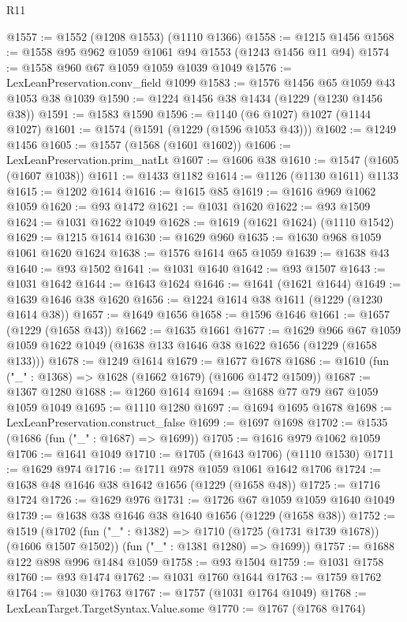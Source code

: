 \begin{lexlean}{R11}
\begin{coremodule}
@1557 := @1552 (@1208 @1553) (@1110 @1366)
@1558 := @1215 @1456
@1568 := @1558 @95 @962 @1059 @1061 @94 @1553 (@1243 @1456 @11 @94)
@1574 := @1558 @960 @67 @1059 @1059 @1039 @1049
@1576 := LexLeanPreservation.conv_field @1099
@1583 := @1576 @1456 @65 @1059 @43 @1053 @38 @1039
@1590 := @1224 @1456 @38 @1434 (@1229 (@1230 @1456 @38))
@1591 := @1583 @1590
@1596 := @1140 (@6 @1027) @1027 (@1144 @1027)
@1601 := @1574 (@1591 (@1229 (@1596 @1053 @43)))
@1602 := @1249 @1456
@1605 := @1557 (@1568 (@1601 @1602))
@1606 := LexLeanPreservation.prim_natLt
@1607 := @1606 @38
@1610 := @1547 (@1605 (@1607 @1038))
@1611 := @1433 @1182
@1614 := @1126 (@1130 @1611) @1133
@1615 := @1202 @1614
@1616 := @1615 @85
@1619 := @1616 @969 @1062 @1059
@1620 := @93 @1472
@1621 := @1031 @1620
@1622 := @93 @1509
@1624 := @1031 @1622 @1049
@1628 := @1619 (@1621 @1624) (@1110 @1542)
@1629 := @1215 @1614
@1630 := @1629 @960
@1635 := @1630 @968 @1059 @1061 @1620 @1624
@1638 := @1576 @1614 @65 @1059
@1639 := @1638 @43
@1640 := @93 @1502
@1641 := @1031 @1640
@1642 := @93 @1507
@1643 := @1031 @1642
@1644 := @1643 @1624
@1646 := @1641 (@1621 @1644)
@1649 := @1639 @1646 @38 @1620
@1656 := @1224 @1614 @38 @1611 (@1229 (@1230 @1614 @38))
@1657 := @1649 @1656
@1658 := @1596 @1646
@1661 := @1657 (@1229 (@1658 @43))
@1662 := @1635 @1661
@1677 := @1629
    @966
    @67
    @1059
    @1059
    @1622
    @1049
    (@1638 @133 @1646 @38 @1622 @1656 (@1229 (@1658 @133)))
@1678 := @1249 @1614
@1679 := @1677 @1678
@1686 := @1610 (fun ("_" : @1368) => @1628 (@1662 @1679) (@1606 @1472 @1509))
@1687 := @1367 @1280
@1688 := @1260 @1614
@1694 := @1688 @77 @79 @67 @1059 @1059 @1049
@1695 := @1110 @1280
@1697 := @1694 @1695 @1678
@1698 := LexLeanPreservation.construct_false
@1699 := @1697 @1698
@1702 := @1535 (@1686 (fun ("_" : @1687) => @1699))
@1705 := @1616 @979 @1062 @1059
@1706 := @1641 @1049
@1710 := @1705 (@1643 @1706) (@1110 @1530)
@1711 := @1629 @974
@1716 := @1711 @978 @1059 @1061 @1642 @1706
@1724 := @1638 @48 @1646 @38 @1642 @1656 (@1229 (@1658 @48))
@1725 := @1716 @1724
@1726 := @1629 @976
@1731 := @1726 @67 @1059 @1059 @1640 @1049
@1739 := @1638 @38 @1646 @38 @1640 @1656 (@1229 (@1658 @38))
@1752 := @1519
    (@1702
      (fun ("_" : @1382) => @1710 (@1725 (@1731 @1739 @1678)) (@1606 @1507 @1502))
      (fun ("_" : @1381 @1280) => @1699))
@1757 := @1688 @122 @898 @996 @1484 @1059
@1758 := @93 @1504
@1759 := @1031 @1758
@1760 := @93 @1474
@1762 := @1031 @1760 @1644
@1763 := @1759 @1762
@1764 := @1030 @1763
@1767 := @1757 (@1031 @1764 @1049)
@1768 := LexLeanTarget.TargetSyntax.Value.some
@1770 := @1767 (@1768 @1764)

\end{coremodule}
\end{lexlean}
